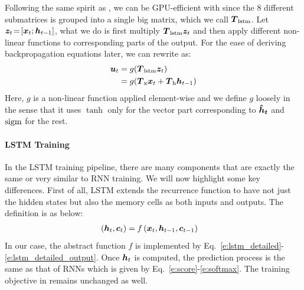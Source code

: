 Following the same spirit as , we can be GPU-efficient with
 since the 8 different submatrices is grouped into a single big matrix,
which we call $\mbox{\boldmath{$T$}}_{\text{lstm}}$. Let $\bm{z}_{t}\!=\![\bm{x}_{t}; \bm{h}_{t-1}]$, what we do is
first multiply $\mbox{\boldmath{$T$}}_{\text{lstm}} \bm{z}_{t}$ and then apply different non-linear functions to
corresponding parts of the output. For the ease of deriving backpropagation
equations later, we can rewrite  as:
\begin{align}
\bm{u}_t &= g(\mbox{\boldmath{$T$}}_{\text{lstm}} \bm{z}_{t}) \label{e:lstm_notation} \\
&= g(\mbox{\boldmath{$T$}}_{\text{x}}\bm{x}_{t} + \mbox{\boldmath{$T$}}_{\text{h}}\bm{h}_{t-1})
\label{e:lstm simplified}
\end{align}
Here, $g$ is a non-linear function applied element-wise and we define $g$ loosely in the sense that it uses $\tanh$ only for the vector part corresponding to $\mbox{\boldmath{$\hat{h}_t$}}$ and $\operatorname{sigm}$ for the rest.



\paragraph{LSTM Training}
In the LSTM training pipeline, there are many components that are exactly the
same or very similar to RNN training. We will now highlight some key
differences. First of all, LSTM extends the recurrence function to have not just
the hidden states but also the memory cells as both inputs and outputs. The
definition is as below:
\begin{align}
\left(\bm{h}_{t}, \bm{c}_{t}\right) &= f\left(\bm{x}_{t}, \bm{h}_{t-1}, \bm{c}_{t-1}\right)
\label{e:abstract_lstm}
\end{align}
In our case, the abstract function $f$ is implemented by
Eq.~\ref{e:lstm_detailed}-\ref{e:lstm_detailed_output}. Once $\bm{h}_{t}$ is
computed, the prediction process is the same as that of RNNs which is given by
Eq.~\ref{e:score}-\ref{e:softmax}. The training objective in 
remains unchanged as well.

